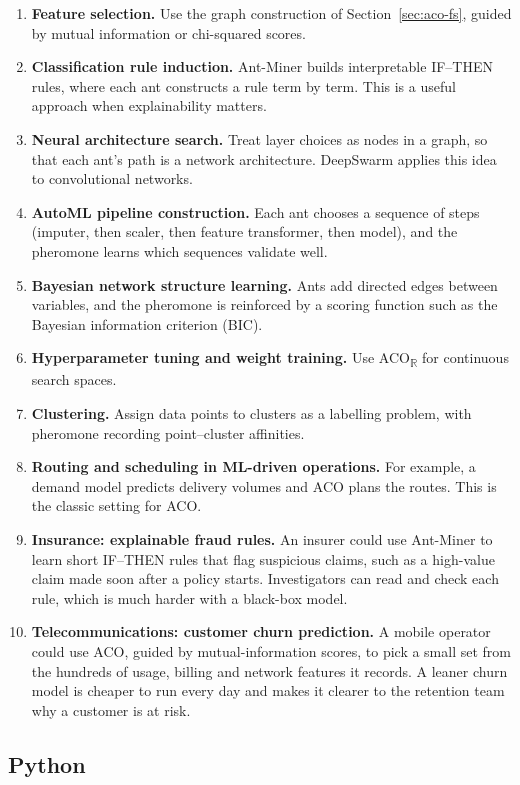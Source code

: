\documentclass[11pt,a4paper]{article}
\newcommand{\ACOR}{ACO\textsubscript{$\mathbb{R}$}}
\begin{document}
\begin{enumerate}
  \item \textbf{Feature selection.} Use the graph construction of Section~\ref{sec:aco-fs}, guided by mutual information or chi-squared scores.
  \item \textbf{Classification rule induction.} Ant-Miner \citep{parpinelli2002} builds interpretable IF--THEN rules, where each ant constructs a rule term by term. This is a useful approach when explainability matters.
  \item \textbf{Neural architecture search.} Treat layer choices as nodes in a graph, so that each ant's path is a network architecture. DeepSwarm \citep{byla2019} applies this idea to convolutional networks.
  \item \textbf{AutoML pipeline construction.} Each ant chooses a sequence of steps (imputer, then scaler, then feature transformer, then model), and the pheromone learns which sequences validate well.
  \item \textbf{Bayesian network structure learning.} Ants add directed edges between variables, and the pheromone is reinforced by a scoring function such as the Bayesian information criterion (BIC).
  \item \textbf{Hyperparameter tuning and weight training.} Use \ACOR{} for continuous search spaces.
  \item \textbf{Clustering.} Assign data points to clusters as a labelling problem, with pheromone recording point--cluster affinities.
  \item \textbf{Routing and scheduling in ML-driven operations.} For example, a demand model predicts delivery volumes and ACO plans the routes. This is the classic setting for ACO.
  \item \textbf{Insurance: explainable fraud rules.} An insurer could use Ant-Miner to learn short IF--THEN rules that flag suspicious claims, such as a high-value claim made soon after a policy starts. Investigators can read and check each rule, which is much harder with a black-box model.
  \item \textbf{Telecommunications: customer churn prediction.} A mobile operator could use ACO, guided by mutual-information scores, to pick a small set from the hundreds of usage, billing and network features it records. A leaner churn model is cheaper to run every day and makes it clearer to the retention team why a customer is at risk.
\end{enumerate}

\subsection{Python}
\end{document}

